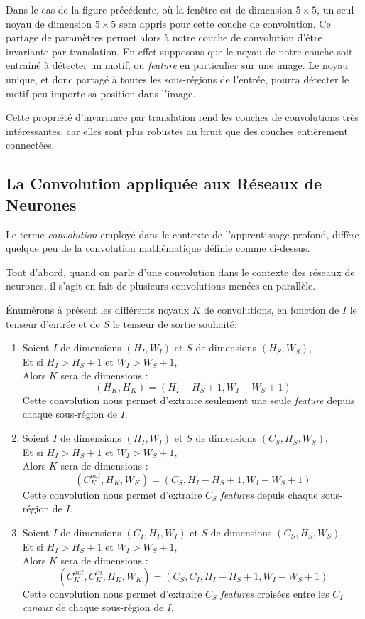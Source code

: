 \documentclass[a4paper, 10pt]{report}
\begin{document}
Dans le cas de la figure précédente, où la fenêtre est de dimension $5 \times 5$, un seul noyau de dimension $5 \times 5$ sera appris pour cette couche de convolution.
Ce partage de paramètres permet alors à notre couche de convolution d'être invariante par translation.
En effet supposons que le noyau de notre couche soit entraîné à détecter un motif, ou \emph{feature} en particulier sur une image. Le noyau unique, et donc partagé à toutes les sous-régions de l'entrée, pourra détecter le motif peu importe sa position dans l'image.
			
Cette propriété d'invariance par translation rend les couches de convolutions très intéressantes, car elles sont plus robustes au bruit que des couches entièrement connectées.
				
\subsection{La Convolution appliquée aux Réseaux de Neurones}
Le terme \emph{convolution} employé dans le contexte de l'apprentissage profond, diffère quelque peu de la convolution mathématique définie comme ci-dessus.

Tout d'abord, quand on parle d'une convolution dans le contexte des réseaux de neurones, il s'agit en fait de plusieurs convolutions menées en parallèle.

Énumérons à présent les différents noyaux $K$ de convolutions, en fonction de $I$ le tenseur d'entrée et de $S$ le tenseur de sortie souhaité:
\begin{enumerate}
	\item Soient $I$ de dimensions $(H_I,W_I)$ et $S$ de dimensions $(H_S, W_S)$,\\
	Et si $H_I > H_S + 1$ et $W_I > W_S + 1$,\\
	Alors $K$ sera de dimensions :
	$$(H_K, H_K) = (H_I - H_S + 1, W_I - W_S + 1)$$
	Cette convolution nous permet d'extraire seulement une seule \emph{feature} depuis chaque sous-région de $I$.\\
	\item Soient $I$ de dimensions $(H_I,W_I)$ et $S$ de dimensions $(C_S, H_S, W_S)$,\\
	Et si $H_I > H_S + 1$ et $W_I > W_S + 1$,\\
	Alors $K$ sera de dimensions :
	$$(C_K^{out}, H_K, W_K) = (C_S, H_I - H_S + 1, W_I - W_S + 1)$$
	Cette convolution nous permet d'extraire $C_S$ \emph{features} depuis chaque sous-région de $I$.\\
	\item Soient $I$ de dimensions $(C_I, H_I,W_I)$ et $S$ de dimensions $(C_S, H_S, W_S)$,\\
	Et si $H_I > H_S + 1$ et $W_I > W_S + 1$,\\
	Alors $K$ sera de dimensions :
	$$(C_K^{out}, C_K^{in}, H_K, W_K) = (C_S, C_I, H_I - H_S + 1, W_I - W_S + 1)$$
	Cette convolution nous permet d'extraire $C_S$ \emph{features} croisées entre les $C_I$ \emph{canaux} de chaque sous-région de $I$.\\	
\end{enumerate}
\end{document}
